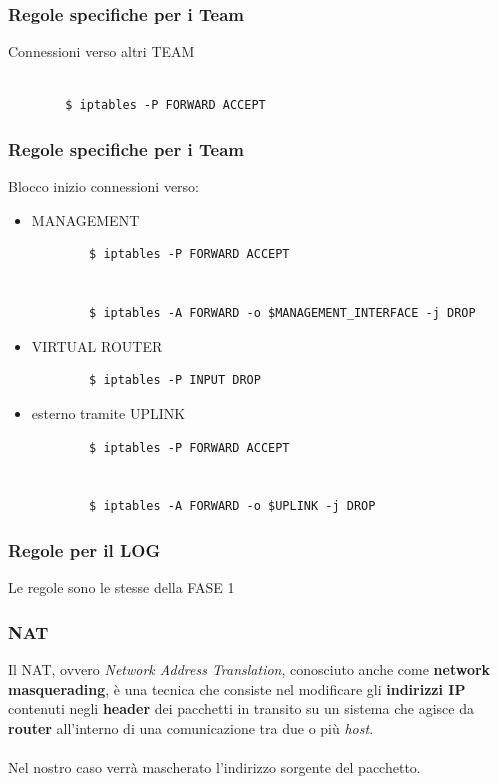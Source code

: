 \documentclass{beamer}
\begin{document}
\begin{frame}[fragile]
    \frametitle{Regole specifiche per i Team}
    Connessioni verso altri TEAM
    \\~\\
    \begin{lstlisting}
        $ iptables -P FORWARD ACCEPT
    \end{lstlisting}

\end{frame}

\begin{frame}[fragile]
    \frametitle{Regole specifiche per i Team}
    Blocco inizio connessioni verso:
    \begin{itemize}
        \item MANAGEMENT
            \begin{lstlisting}
        $ iptables -P FORWARD ACCEPT


        $ iptables -A FORWARD -o $MANAGEMENT_INTERFACE -j DROP
            \end{lstlisting}
        \item VIRTUAL ROUTER
            \begin{lstlisting}
        $ iptables -P INPUT DROP  
            \end{lstlisting}
        \item esterno tramite UPLINK
            \begin{lstlisting}
        $ iptables -P FORWARD ACCEPT


        $ iptables -A FORWARD -o $UPLINK -j DROP
            \end{lstlisting}
    \end{itemize}
\end{frame}

\begin{frame}
    \frametitle{Regole per il LOG}
    Le regole sono le stesse della FASE 1
\end{frame}

\begin{frame}
    \frametitle{NAT}
     {Il NAT, ovvero \textit{Network Address Translation}, conosciuto anche come \textbf{network masquerading}, è una tecnica
    che consiste nel modificare gli \textbf{indirizzi IP} contenuti negli \textbf{header} dei pacchetti in transito su
    un sistema che agisce da \textbf{router} all'interno di una comunicazione tra due o più \textit{host}.}
    \\~\\
     {Nel nostro caso verrà mascherato l'indirizzo sorgente del pacchetto.}

\end{frame}
\end{document}
